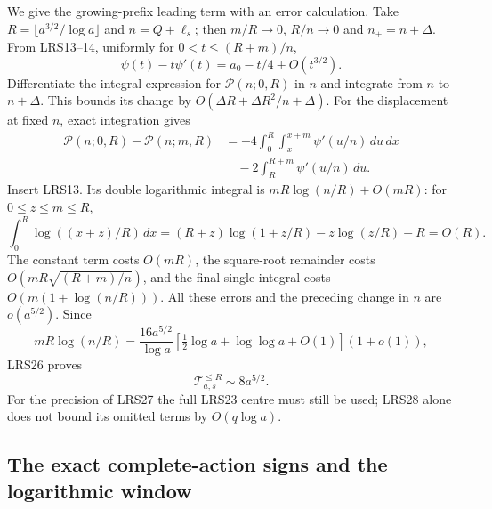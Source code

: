 We give the growing-prefix leading term with an error calculation.
Take $R=\lfloor a^{3/2}/\log a\rfloor$ and $n=Q+\ell_s$; then
$m/R\to0$, $R/n\to0$ and $n_+=n+\Delta$.
From LRS13--14, uniformly for $0<t\le(R+m)/n$,
\[
 \psi(t)-t\psi'(t)=a_0-t/4+O(t^{3/2}).
\]
Differentiate the integral expression for $\mathscr P(n;0,R)$ in
$n$ and integrate from $n$ to $n+\Delta$.  This bounds its change by
$O(\Delta R+\Delta R^2/n+\Delta)$.
For the displacement at fixed $n$, exact integration gives
\[
\begin{split}
 \mathscr P(n;0,R)-\mathscr P(n;m,R)
 &=-4\int_0^R\int_x^{x+m}\psi'(u/n)\,du\,dx\\
 &\quad-2\int_R^{R+m}\psi'(u/n)\,du.
\end{split}
\]
Insert LRS13.  Its double logarithmic integral is
$mR\log(n/R)+O(mR)$: for $0\le z\le m\le R$,
\[
 \int_0^R\log((x+z)/R)\,dx
 =(R+z)\log(1+z/R)-z\log(z/R)-R=O(R).
\]
The constant term costs $O(mR)$, the square-root remainder costs
$O(mR\sqrt{(R+m)/n})$, and the final single integral costs
$O(m(1+\log(n/R)))$.  All these errors and the preceding change
in $n$ are $o(a^{5/2})$.  Since
\[
 mR\log(n/R)
 =\frac{16a^{5/2}}{\log a}
      [\tfrac12\log a+\log\log a+O(1)](1+o(1)),
\]
LRS26 proves
\begin{equation}\tag{LRS28}
 \mathcal T_{a,s}^{\le R}\sim8a^{5/2}.
\end{equation}
For the precision of LRS27 the full LRS23 centre must still be used;
LRS28 alone does not bound its omitted terms by $O(q\log a)$.

\subsection{The exact complete-action signs and the logarithmic window}

